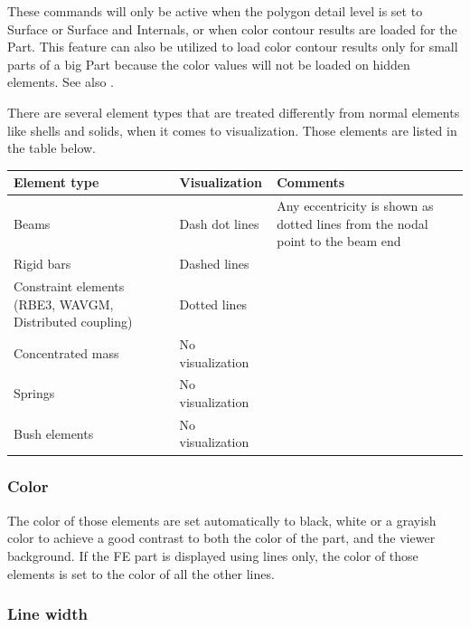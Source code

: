 These commands will only be active when the polygon detail level is set to
Surface or Surface and Internals, or when color contour results are loaded for
the Part. This feature can also be utilized to load color contour results only
for small parts of a big Part because the color values will not be loaded on
hidden elements. See also
.




There are several element types that are treated differently from normal elements
like shells and solids, when it comes to visualization. Those elements are
listed in the table below.

\begin{table}[h!]
\begin{tabular}{ | m{33mm} | m{25mm}| m{45mm} | }
 \hline
 Element type & Visualization & Comments \\
 \hline\hline
 Beams & Dash dot lines & Any eccentricity is shown as dotted lines from the nodal point to the beam end \\
 \hline
 Rigid bars & Dashed lines & \\
 \hline\raggedright
 Constraint elements (RBE3, WAVGM, Distributed coupling) & Dotted lines &  \\
 \hline
 Concentrated mass & No visualization & \\
 \hline
 Springs & No visualization &  \\
 \hline
 Bush elements & No visualization & \\
 \hline
\end{tabular}
\end{table}

\subsubsection{Color}

The color of those elements are set automatically to black, white or a
grayish color to achieve a good contrast to both the color of the part,
and the viewer background. If the FE part is displayed using lines only,
the color of those elements is set to the color of all the other lines.

\subsubsection{Line width}

